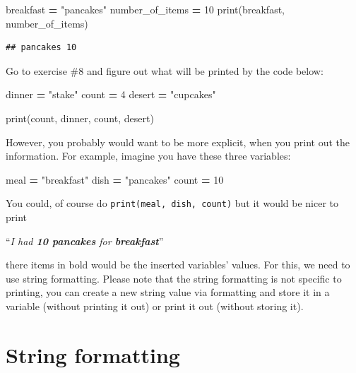 \documentclass[
]{book}
\newenvironment{Shaded}{\begin{snugshade}}{\end{snugshade}}
\newcommand{\BuiltInTok}[1]{#1}
\newcommand{\DecValTok}[1]{\textcolor[rgb]{0.00,0.00,0.81}{#1}}
\newcommand{\NormalTok}[1]{#1}
\newcommand{\OperatorTok}[1]{\textcolor[rgb]{0.81,0.36,0.00}{\textbf{#1}}}
\newcommand{\StringTok}[1]{\textcolor[rgb]{0.31,0.60,0.02}{#1}}
\begin{document}
\begin{Shaded}
\begin{Highlighting}[]
\NormalTok{breakfast }\OperatorTok{=} \StringTok{"pancakes"}
\NormalTok{number\_of\_items }\OperatorTok{=} \DecValTok{10}
\BuiltInTok{print}\NormalTok{(breakfast, number\_of\_items)}
\end{Highlighting}
\end{Shaded}

\begin{verbatim}
## pancakes 10
\end{verbatim}

Go to exercise \#8 and figure out what will be printed by the code below:

\begin{Shaded}
\begin{Highlighting}[]
\NormalTok{dinner }\OperatorTok{=} \StringTok{"stake"}
\NormalTok{count }\OperatorTok{=} \DecValTok{4}
\NormalTok{desert }\OperatorTok{=} \StringTok{"cupcakes"}

\BuiltInTok{print}\NormalTok{(count, dinner, count, desert)}
\end{Highlighting}
\end{Shaded}

However, you probably would want to be more explicit, when you print out the information. For example, imagine you have these three variables:

\begin{Shaded}
\begin{Highlighting}[]
\NormalTok{meal }\OperatorTok{=} \StringTok{"breakfast"}
\NormalTok{dish }\OperatorTok{=} \StringTok{"pancakes"}
\NormalTok{count }\OperatorTok{=} \DecValTok{10}
\end{Highlighting}
\end{Shaded}

You could, of course do \texttt{print(meal,\ dish,\ count)} but it would be nicer to print

``\emph{I had \textbf{10 pancakes} for \textbf{breakfast}}''

there items in bold would be the inserted variables' values. For this, we need to use string formatting. Please note that the string formatting is not specific to printing, you can create a new string value via formatting and store it in a variable (without printing it out) or print it out (without storing it).

\hypertarget{string-formatting}{%
\section{String formatting}\label{string-formatting}}
\end{document}
